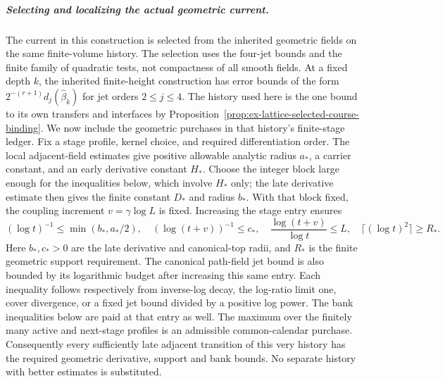 \subparagraph{Selecting and localizing the actual geometric current.}
The current in this construction is selected from the inherited geometric
fields on the same finite-volume history. The selection uses the four-jet
bounds and the finite family of quadratic tests, not compactness of all
smooth fields. At a fixed depth $k$, the inherited finite-height
construction has error bounds of the form
$2^{-(r+1)}d_j(\widehat\beta_k)$ for jet orders $2\le j\le4$.
The history used here is the one bound to its own transfers and interfaces
by Proposition~\ref{prop:ex-lattice-selected-course-binding}. We now
include the geometric purchases in that history's finite-stage ledger.
Fix a stage profile, kernel choice, and required differentiation order.
The local adjacent-field estimates give positive allowable analytic
radius $a_*$, a carrier constant, and an early derivative constant
$H_*$. Choose the integer block large enough for the inequalities
below, which involve $H_*$ only; the late derivative estimate then
gives the finite constant $D_*$ and radius $b_*$. With that block fixed, the coupling increment
$v=\gamma\log L$ is fixed. Increasing the stage entry ensures
\[
 (\log t)^{-1}\le\min(b_*,a_*/2),\quad
 (\log(t+v))^{-1}\le c_*,\quad
 \frac{\log(t+v)}{\log t}\le L,\quad
 \lceil(\log t)^2\rceil\ge R_*.
\]
Here $b_*,c_*>0$ are the late derivative and canonical-top radii,
and $R_*$ is the finite geometric support requirement. The canonical
path-field jet bound is also bounded by its logarithmic budget after
increasing this same entry. Each inequality follows respectively from
inverse-log decay, the log-ratio limit one, cover divergence, or a fixed
jet bound divided by a positive log power. The bank inequalities below
are paid at that entry as well. The maximum over the finitely many
active and next-stage profiles is an admissible common-calendar
purchase. Consequently every sufficiently late adjacent transition of
this very history has the required geometric derivative, support and
bank bounds. No separate history with better estimates is substituted.

